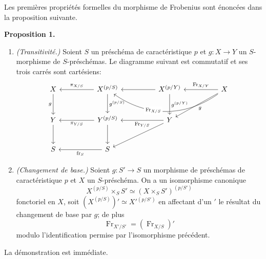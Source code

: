 \documentclass[11pt]{article}
\newenvironment{statement}[1]{\par\medskip\noindent\textbf{#1.}\ }{\par\medskip}
\providecommand{\fr}{\operatorname{fr}}
\providecommand{\Fr}{\operatorname{Fr}}
\providecommand{\Fr}{\operatorname{Fr}}
\providecommand{\fr}{\operatorname{fr}}
\begin{document}
Les premières propriétés formelles du morphisme de Frobenius sont énoncées dans la proposition suivante.

\begin{statement}{Proposition 1}
\begin{enumerate}[label=\alph*)]
\item \emph{(Transitivité.)} Soient $S$ un préschéma de caractéristique $p$ et $g:X\to Y$ un $S$-morphisme de $S$-préschémas. Le diagramme suivant est commutatif et ses trois carrés sont cartésiens:
\[
\begin{tikzcd}[column sep=huge,row sep=large]
X \arrow[d,"g"'] & X^{(p/S)} \arrow[l,"\pi_{X/S}"'] \arrow[d,"g^{(p/S)}"] & X^{(p/Y)} \arrow[l] \arrow[d,"g^{(p/Y)}"] & X \arrow[l,"\Fr_{X/Y}"'] \arrow[ll,bend left=35,"\Fr_{X/S}"{description,pos=0.62}] \arrow[dl,"g"] \\
Y \arrow[d] & Y^{(p/S)} \arrow[l,"\pi_{Y/S}"] \arrow[d] & Y \arrow[l,"\Fr_{Y/S}"] \arrow[dl] & {} \\
S & S \arrow[l,"\fr_S"] & {} & {}
\end{tikzcd}
\]

\item \emph{(Changement de base.)} Soient $g:S'\to S$ un morphisme de préschémas de caractéristique $p$ et $X$ un $S$-préschéma. On a un isomorphisme canonique
\[
X^{(p/S)}\times_S S'\simeq (X\times_S S')^{(p/S')}
\]
fonctoriel en $X$, soit $(X^{(p/S)})'\simeq X'{}^{(p/S')}$ en affectant d'un $'$ le résultat du changement de base par $g$; de plus
\[
\Fr_{X'/S'}=(\Fr_{X/S})'
\]
modulo l'identification permise par l'isomorphisme précédent.
\end{enumerate}
\end{statement}

La démonstration est immédiate.
\end{document}
